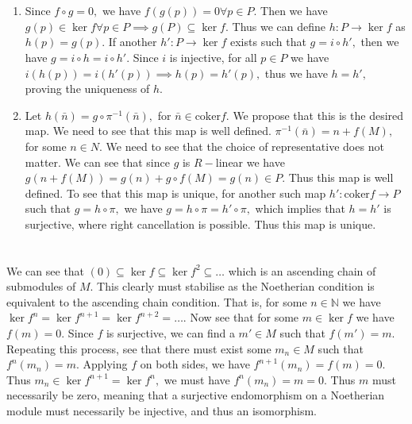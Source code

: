 \documentclass{article}
\begin{document}
\section{} %
\begin{enumerate}
	\item Since $f \circ g=0,$ we have $f(g(p))=0 \forall p \in P.$ Then we have $g(p) \in \ker f \forall p \in P \implies g(P) \subseteq \ker f.$ Thus we can define $h: P \rightarrow \ker f$ as $h(p)=g(p).$ If another $h': P \rightarrow \ker f$ exists such that $g=i \circ h',$ then we have $g=i \circ h= i \circ h'.$ Since $i$ is injective, for all $p \in P$ we have $i(h(p))=i(h'(p)) \implies h(p)=h'(p),$ thus we have $h=h',$ proving the uniqueness of $h.$
	
	\item Let $h(\bar{n})=g\circ \pi^{-1}(\bar{n}),$ for $\bar{n} \in \text{coker} f.$ We propose that this is the desired map. We need to see that this map is well defined. $\pi^{-1}(\bar{n})= n + f(M),$ for some $n \in N.$ We need to see that the choice of representative does not matter. We can see that since $g$ is $R-$linear we have $g(n + f(M))= g(n) + g \circ f(M)=g(n) \in P.$ Thus this map is well defined. To see that this map is unique, for another such map $h': \text{coker} f \rightarrow P$ such that $ g=h \circ \pi,$ we have $g=h \circ \pi= h' \circ \pi,$ which implies that $h=h'$ is surjective, where right cancellation is possible. Thus this map is unique. 
\end{enumerate}
\section{} %
We can see that $(0) \subseteq \ker f \subseteq \ker f^2 \subseteq \dots$ which is an ascending chain of submodules of $M.$ This clearly must stabilise as the Noetherian condition is equivalent to the ascending chain condition. That is, for some $n \in \mathbb{N}$ we have $\ker f^n=\ker f^{n+1}=\ker f^{n+2}=\dots.$ Now see that for some $m \in \ker f$ we have $f(m)=0.$ Since $f$ is surjective, we can find a $m' \in M$ such that $f(m')=m.$ Repeating this process, see that there must exist some $m_n \in M$ such that $f^n(m_n)=m.$ Applying $f$ on both sides, we have $f^{n+1}(m_n)=f(m)=0.$ Thus $m_n \in \ker f^{n+1}=\ker f^n,$ we must have $f^n(m_n)=m=0.$ Thus $m$ must necessarily be zero, meaning that a surjective endomorphism on a Noetherian module must necessarily be injective, and thus an isomorphism. 
\end{document}
